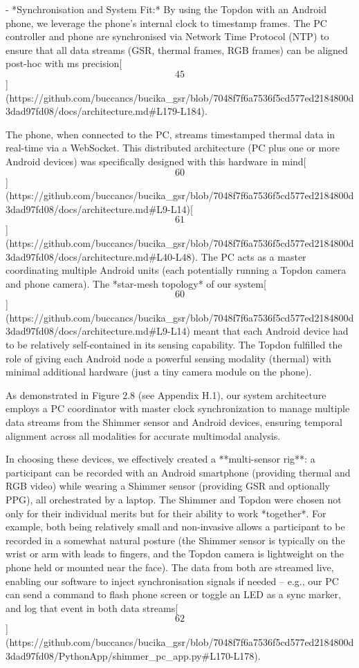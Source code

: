 \documentclass[12pt,a4paper]{article}
\begin{document}
- *Synchronisation and System Fit:* By using the Topdon with an Android
  phone, we leverage the phone's internal clock to timestamp frames. The
  PC controller and phone are synchronised via Network Time Protocol
  (NTP) to ensure that all data streams (GSR, thermal frames, RGB
  frames) can be aligned post-hoc with  ms
  precision[\[45\]](https://github.com/buccancs/bucika_gsr/blob/7048f7f6a7536f5cd577ed2184800d3dad97fd08/docs/architecture.md#L179-L184).

  The phone, when connected to the PC, streams timestamped thermal data
  in real-time via a WebSocket. This distributed architecture (PC plus
  one or more Android devices) was specifically designed with this
  hardware in
  mind[\[60\]](https://github.com/buccancs/bucika_gsr/blob/7048f7f6a7536f5cd577ed2184800d3dad97fd08/docs/architecture.md#L9-L14)[\[61\]](https://github.com/buccancs/bucika_gsr/blob/7048f7f6a7536f5cd577ed2184800d3dad97fd08/docs/architecture.md#L40-L48).
  The PC acts as a master coordinating multiple Android units (each
  potentially running a Topdon camera and phone camera). The *star-mesh
  topology* of our
  system[\[60\]](https://github.com/buccancs/bucika_gsr/blob/7048f7f6a7536f5cd577ed2184800d3dad97fd08/docs/architecture.md#L9-L14)
  meant that each Android device had to be relatively self-contained in
  its sensing capability. The Topdon fulfilled the role of giving each
  Android node a powerful sensing modality (thermal) with minimal
  additional hardware (just a tiny camera module on the phone).

As demonstrated in Figure 2.8 (see Appendix H.1), our system architecture employs a PC coordinator with master clock synchronization to manage multiple data streams from the Shimmer sensor and Android devices, ensuring temporal alignment across all modalities for accurate multimodal analysis.

In choosing these devices, we effectively created a **multi-sensor
rig**: a participant can be recorded with an Android smartphone
(providing thermal and RGB video) while wearing a Shimmer sensor
(providing GSR and optionally PPG), all orchestrated by a laptop. The
Shimmer and Topdon were chosen not only for their individual merits but
for their ability to work *together*. For example, both being relatively
small and non-invasive allows a participant to be recorded in a somewhat
natural posture (the Shimmer sensor is typically on the wrist or arm
with leads to fingers, and the Topdon camera is lightweight on the phone
held or mounted near the face). The data from both are streamed live,
enabling our software to inject synchronisation signals if needed --
e.g., our PC can send a command to flash phone screen or toggle an LED
as a sync marker, and log that event in both data
streams[\[62\]](https://github.com/buccancs/bucika_gsr/blob/7048f7f6a7536f5cd577ed2184800d3dad97fd08/PythonApp/shimmer_pc_app.py#L170-L178).
\end{document}
